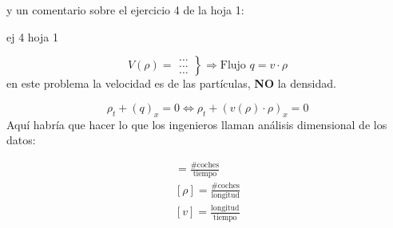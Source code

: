 	y un comentario sobre el ejercicio 4 de la hoja 1:

	\begin{example}{ej 4 hoja 1}

		\[ V(\rho) =
		\left.
		\begin{array}{l}
			… \\
			… \\
			…
		\end{array}
		\right\} \Rightarrow \text{Flujo } q = v \cdot \rho
		\]
		\obs en este problema la velocidad es de las partículas, {\bf NO} la densidad.

		$$\rho_t + (q)_x = 0 \iff \rho_t + (v(\rho) \cdot \rho)_x = 0$$
		Aquí habría que hacer lo que los ingenieros llaman análisis dimensional de los datos:

		\begin{gather*}
		[y] = \frac{\text{\# coches}}{\text{tiempo}}\\
		[\rho] = \frac{\text{\# coches}}{\text{longitud}}\\
		[v] = \frac{\text{longitud}}{\text{tiempo}}
		\end{gather*}



	\end{example}

